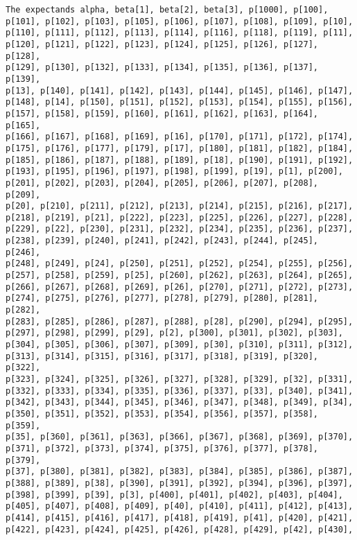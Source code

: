\documentclass[
  letterpaper,
  DIV=11,
  numbers=noendperiod]{scrartcl}
\begin{document}
\begin{verbatim}
The expectands alpha, beta[1], beta[2], beta[3], p[1000], p[100],
p[101], p[102], p[103], p[105], p[106], p[107], p[108], p[109], p[10],
p[110], p[111], p[112], p[113], p[114], p[116], p[118], p[119], p[11],
p[120], p[121], p[122], p[123], p[124], p[125], p[126], p[127], p[128],
p[129], p[130], p[132], p[133], p[134], p[135], p[136], p[137], p[139],
p[13], p[140], p[141], p[142], p[143], p[144], p[145], p[146], p[147],
p[148], p[14], p[150], p[151], p[152], p[153], p[154], p[155], p[156],
p[157], p[158], p[159], p[160], p[161], p[162], p[163], p[164], p[165],
p[166], p[167], p[168], p[169], p[16], p[170], p[171], p[172], p[174],
p[175], p[176], p[177], p[179], p[17], p[180], p[181], p[182], p[184],
p[185], p[186], p[187], p[188], p[189], p[18], p[190], p[191], p[192],
p[193], p[195], p[196], p[197], p[198], p[199], p[19], p[1], p[200],
p[201], p[202], p[203], p[204], p[205], p[206], p[207], p[208], p[209],
p[20], p[210], p[211], p[212], p[213], p[214], p[215], p[216], p[217],
p[218], p[219], p[21], p[222], p[223], p[225], p[226], p[227], p[228],
p[229], p[22], p[230], p[231], p[232], p[234], p[235], p[236], p[237],
p[238], p[239], p[240], p[241], p[242], p[243], p[244], p[245], p[246],
p[248], p[249], p[24], p[250], p[251], p[252], p[254], p[255], p[256],
p[257], p[258], p[259], p[25], p[260], p[262], p[263], p[264], p[265],
p[266], p[267], p[268], p[269], p[26], p[270], p[271], p[272], p[273],
p[274], p[275], p[276], p[277], p[278], p[279], p[280], p[281], p[282],
p[283], p[285], p[286], p[287], p[288], p[28], p[290], p[294], p[295],
p[297], p[298], p[299], p[29], p[2], p[300], p[301], p[302], p[303],
p[304], p[305], p[306], p[307], p[309], p[30], p[310], p[311], p[312],
p[313], p[314], p[315], p[316], p[317], p[318], p[319], p[320], p[322],
p[323], p[324], p[325], p[326], p[327], p[328], p[329], p[32], p[331],
p[332], p[333], p[334], p[335], p[336], p[337], p[33], p[340], p[341],
p[342], p[343], p[344], p[345], p[346], p[347], p[348], p[349], p[34],
p[350], p[351], p[352], p[353], p[354], p[356], p[357], p[358], p[359],
p[35], p[360], p[361], p[363], p[366], p[367], p[368], p[369], p[370],
p[371], p[372], p[373], p[374], p[375], p[376], p[377], p[378], p[379],
p[37], p[380], p[381], p[382], p[383], p[384], p[385], p[386], p[387],
p[388], p[389], p[38], p[390], p[391], p[392], p[394], p[396], p[397],
p[398], p[399], p[39], p[3], p[400], p[401], p[402], p[403], p[404],
p[405], p[407], p[408], p[409], p[40], p[410], p[411], p[412], p[413],
p[414], p[415], p[416], p[417], p[418], p[419], p[41], p[420], p[421],
p[422], p[423], p[424], p[425], p[426], p[428], p[429], p[42], p[430],

\end{verbatim}
\end{document}
